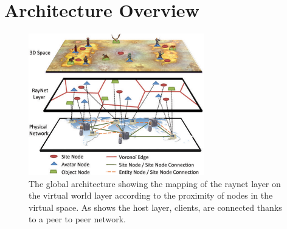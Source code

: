 \section{Architecture Overview}
\label{sec:overview}

\begin{figure}
\center
\includegraphics[width=3in]{Figures/Overview.pdf}
\caption{The global architecture showing the mapping of the raynet layer on the virtual world layer according to the proximity of nodes in the virtual space. As shows the host layer, clients, are connected thanks to a peer to peer network.}
\label{Fig:Overview}
\end{figure}



